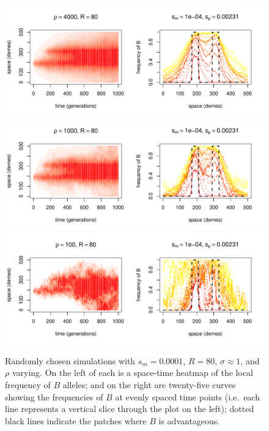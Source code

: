 \documentclass{article}
\newif\ifsubmissionversion
\begin{document}
\begin{figure}
  \begin{center}
    \includegraphics{example-migration-sims/26044-r1-501-sb0_01-sm-1e-04-N4000-pophistory-run}
    \includegraphics{example-migration-sims/85750-r1-501-sb0_01-sm-1e-04-N1000-pophistory-run}
    \includegraphics{example-migration-sims/4111-r1-501-sb0_01-sm-1e-04-N100-pophistory-run}
  \end{center}
  \caption{
    Randomly chosen simulations with $s_m=0.0001$, $R=80$, $\sigma\approx 1$, and $\rho$ varying.
    On the left of each is a space-time heatmap of the local frequency of $B$ alleles;
    and on the right are twenty-five curves showing the frequencies of $B$ at evenly spaced time points
    (i.e.\ each line represents a vertical slice through the plot on the left);
    dotted black lines indicate the patches where $B$ is advantageous.
  } \label{sfig:sims_8}
\end{figure}





\ifsubmissionversion
\processdelayedfloats
\fi


\end{document}
